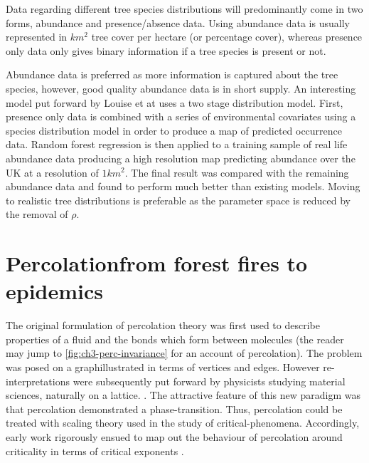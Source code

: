 Data regarding different tree species distributions will predominantly come in two forms, abundance and presence/absence data. Using abundance data is usually represented in $km^2$ tree cover per hectare (or percentage cover), whereas presence only data only gives binary information if a tree species is present or not.

Abundance data is preferred as more information is captured about the tree species, however, good quality abundance data is in short supply. An interesting model put forward by Louise et at \cite{2STAGE} uses a two stage distribution model. First, presence only data is combined with a series of environmental covariates using a species distribution model in order to produce a map of predicted occurrence data. Random forest regression is then applied to a training sample of real life abundance data producing a high resolution map predicting abundance over the UK at a resolution of $1km^2$. The final result was compared with the remaining abundance data and found to perform much better than existing models. Moving to realistic tree distributions is preferable as the parameter space is reduced by the removal of $\rho$.


\section{Percolation\textemdash from forest fires to epidemics}
\label{section:lit-rev-perc}

The original formulation of percolation theory was first used to describe properties of a fluid and the bonds which form between molecules \cite{perco_origin} (the reader may jump to \ref{fig:ch3-perc-invariance} for an account of percolation). The problem was posed on a graph\textemdash illustrated in terms of vertices and edges. However re-interpretations were subsequently put forward by physicists studying material sciences, naturally on a lattice. \cite{Essam_1980}. The attractive feature of this new paradigm was that percolation demonstrated a phase-transition. Thus, percolation could be treated with scaling theory used in the study of critical-phenomena. Accordingly, early work rigorously ensued to map out the behaviour of percolation around criticality in terms of critical exponents \cite{STAUFFER19791}. 

